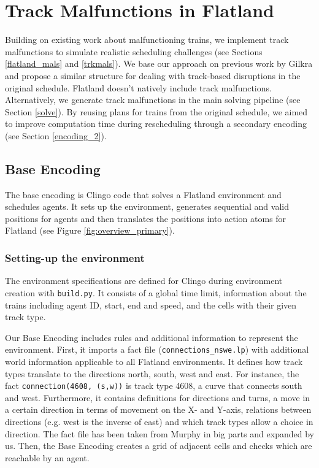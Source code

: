 \documentclass[runningheads]{llncs}
\begin{document}
\section{Track Malfunctions in Flatland}


Building on existing work about malfunctioning trains, we implement \cite{TRailMix2026} track malfunctions to simulate realistic scheduling challenges (see Sections \ref{flatland_mals} and \ref{trkmals}). We base our approach on previous work by Gilkra \cite{gilkra2025} and propose a similar structure for dealing with track-based disruptions in the original schedule. Flatland doesn't natively include track malfunctions. Alternatively, we generate track malfunctions in the main solving pipeline (see Section \ref{solve}). By reusing plans for trains from the original schedule,  we aimed to improve computation time during rescheduling through a secondary encoding (see Section \ref{encoding_2}).


\subsection{Base Encoding} \label{encoding_1}

The base encoding is Clingo code that solves a Flatland environment and schedules agents. It sets up the environment, generates sequential and valid positions for agents and then translates the positions into action atoms for Flatland (see Figure \ref{fig:overview_primary}). 

\subsubsection{Setting-up the environment} \label{setup_base}
The environment specifications are defined for Clingo during environment creation with \verb|build.py|. It consists of a global time limit, information about the trains including agent ID, start, end and speed, and the cells with their given track type.

Our Base Encoding includes rules and additional information to represent the environment. First, it imports a fact file (\verb|connections_nswe.lp|) with additional world information applicable to all Flatland environments. It defines how track types translate to the directions north, south, west and east. For instance, the fact \verb|connection(4608, (s,w))| is track type 4608, a curve that connects south and west. Furthermore, it contains definitions for directions and turns, a move in a certain direction in terms of movement on the X- and Y-axis, relations between directions (e.g. west is the inverse of east) and which track types allow a choice in direction. The fact file has been taken from Murphy \cite{Murphy2026a} in big parts and expanded by us. Then, the Base Encoding creates a grid of adjacent cells and checks which are reachable by an agent.
\end{document}
